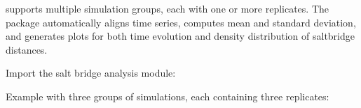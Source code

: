 \documentclass[a4paper,10pt,english]{sphinxmanual}
\begin{document}
\sphinxAtStartPar
{} supports multiple simulation groups, each with one or more replicates. The package automatically aligns time series, computes mean and standard deviation, and generates plots for both time evolution and density distribution of salt\sphinxhyphen{}bridge distances.

\sphinxAtStartPar
{}

\sphinxAtStartPar
Import the salt bridge analysis module:

\begin{sphinxVerbatim}[commandchars=\\\{\}]
 
\end{sphinxVerbatim}

\sphinxAtStartPar
Example with three groups of simulations, each containing three replicates:
\end{document}
